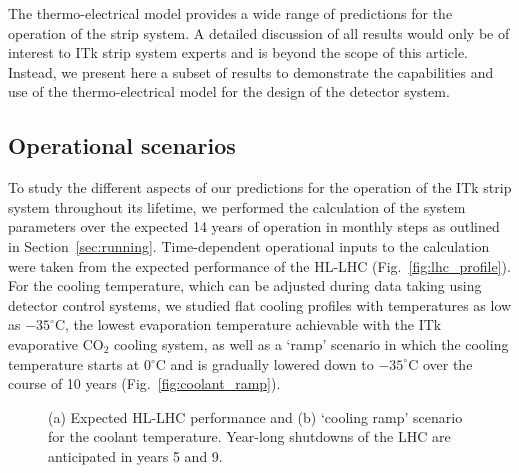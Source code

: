
The thermo-electrical model provides a wide range of predictions for the operation of the strip system. A detailed discussion of all results would only be of interest to ITk strip system experts and is beyond the scope of this article. Instead, we present here a subset of results to demonstrate the capabilities and use of the thermo-electrical model for the design of the detector system.

\subsection{Operational scenarios}\label{sec:opscenarios}
To study the different aspects of our predictions for the operation of the ITk strip system throughout its lifetime, we performed the calculation of the system parameters over the expected 14 years of operation in monthly steps as outlined in Section~\ref{sec:running}. Time-dependent operational inputs to the calculation were taken from the expected performance of the HL-LHC (Fig.~\ref{fig:lhc_profile}). For the cooling temperature, which can be adjusted during data taking using detector control systems, we studied flat cooling profiles with temperatures as low as $-35^\circ$C, the lowest evaporation temperature achievable with the ITk evaporative CO$_2$ cooling system, as well as a `ramp' scenario in which the cooling temperature starts at 0$^\circ$C and is gradually lowered down to $-35^\circ$C over the course of 10 years (Fig.~\ref{fig:coolant_ramp}).

\begin{figure}[ht]
\centering
{}\quad\quad
{}
\caption{(a) Expected HL-LHC performance and (b) `cooling ramp' scenario for the coolant temperature. Year-long shutdowns of the LHC are anticipated in years 5 and 9.}
\label{fig:opscenarios}
\end{figure}

